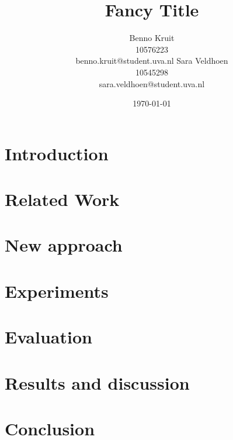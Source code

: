\documentclass[11pt]{article}
\title{Fancy Title}
\author{Benno Kruit\\10576223\\benno.kruit@student.uva.nl\And
Sara Veldhoen\\10545298\\sara.veldhoen@student.uva.nl}
\date{\today}
\begin{document}
\maketitle



\section{Introduction}\label{s:introduction}

\section{Related Work}\label{s:relatedWork}

\section{New approach}\label{s:newApproach}

\section{Experiments}\label{s:experiments}

\section{Evaluation}\label{s:evaluation}

\section{Results and discussion}\label{s:results}

\section{Conclusion}\label{s:conclusion}




\end{document}

